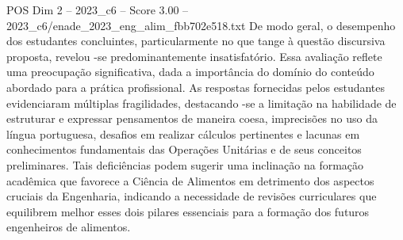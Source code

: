 \begin{textsample}{POS Dim 2 – 2023\_c6 – Score 3.00 – 2023\_c6/enade\_2023\_eng\_alim\_fbb702e518.txt}
De modo geral, o desempenho dos estudantes concluintes, particularmente no que tange à questão discursiva proposta, revelou -se predominantemente insatisfatório.
Essa avaliação reflete uma preocupação significativa, dada a importância do domínio do conteúdo abordado para a prática profissional.
As respostas fornecidas pelos estudantes evidenciaram múltiplas fragilidades, destacando -se a limitação na habilidade de estruturar e expressar pensamentos de maneira coesa, imprecisões no uso da língua portuguesa, desafios em realizar cálculos pertinentes e lacunas em conhecimentos fundamentais das Operações Unitárias e de seus conceitos preliminares.
Tais deficiências podem sugerir uma inclinação na formação acadêmica que favorece a Ciência de Alimentos em detrimento dos aspectos cruciais da Engenharia, indicando a necessidade de revisões curriculares que equilibrem melhor esses dois pilares essenciais para a formação dos futuros engenheiros de alimentos.

\end{textsample}

